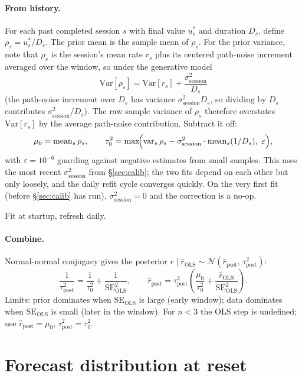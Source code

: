 \documentclass[11pt]{article}
\newcommand{\rpost}{\hat r_{\text{post}}}
\newcommand{\taupostsq}{\tau_{\text{post}}^2}
\newcommand{\tauzerosq}{\tau_0^2}
\newcommand{\rols}{\hat r_{\text{OLS}}}
\newcommand{\seols}{\mathrm{SE}_{\text{OLS}}}
\newcommand{\seolssq}{\mathrm{SE}_{\text{OLS}}^2}
\newcommand{\sigsessionsq}{\sigma_{\text{session}}^2}
\begin{document}
\paragraph{From history.} For each past completed session $s$ with final
value $u_s^\ast$ and duration $D_s$, define $\rho_s = u_s^\ast / D_s$. The
prior mean is the sample mean of $\rho_s$. For the prior variance, note that
$\rho_s$ is the session's mean rate $r_s$ plus its centered path-noise
increment averaged over the window, so under the generative model
\[
  \mathrm{Var}[\rho_s] = \mathrm{Var}[r_s] + \frac{\sigsessionsq}{D_s}
\]
(the path-noise increment over $D_s$ has variance $\sigsessionsq D_s$, so
dividing by $D_s$ contributes $\sigsessionsq/D_s$). The raw sample variance of
$\rho_s$ therefore overstates $\mathrm{Var}[r_s]$ by the average path-noise
contribution. Subtract it off:
\[
  \mu_0 = \mathrm{mean}_s\,\rho_s,
  \qquad
  \tauzerosq = \max\!\Bigl(\mathrm{var}_s\,\rho_s
    - \sigsessionsq \cdot \mathrm{mean}_s(1/D_s),\ \varepsilon\Bigr),
\]
with $\varepsilon = 10^{-6}$ guarding against negative estimates from small
samples. This uses the most recent $\sigsessionsq$ from \S\ref{sec:calib};
the two fits depend on each other but only loosely, and the daily refit
cycle converges quickly. On the very first fit (before \S\ref{sec:calib} has
run), $\sigsessionsq = 0$ and the correction is a no-op.

Fit at startup, refresh daily.

\paragraph{Combine.} Normal-normal conjugacy gives the posterior $r \mid
\rols \sim \mathcal{N}(\rpost,\, \taupostsq)$:
\[
  \frac{1}{\taupostsq} = \frac{1}{\tauzerosq} + \frac{1}{\seolssq},
  \qquad
  \rpost = \taupostsq
    \left(\frac{\mu_0}{\tauzerosq} + \frac{\rols}{\seolssq}\right).
\]
Limits: prior dominates when $\seols$ is large (early window); data
dominates when $\seols$ is small (later in the window). For $n < 3$ the OLS
step is undefined; use $\rpost = \mu_0$, $\taupostsq = \tauzerosq$.

\section{Forecast distribution at reset}\label{sec:forecast}
\end{document}

